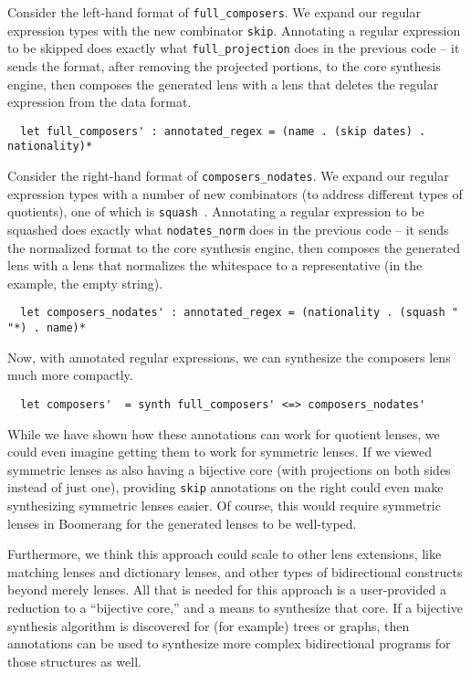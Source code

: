 \documentclass[a4paper]{article}
\begin{document}
Consider the left-hand format of \lstinline{full_composers}. We expand our
regular expression types with the new combinator \lstinline{skip}. Annotating a
regular expression to be skipped does exactly what \lstinline{full_projection}
does in the previous code -- it sends the format, after removing the projected
portions, to the core synthesis engine, then composes the generated lens with a
lens that deletes the regular expression from the data format.
%
\begin{lstlisting}
  let full_composers' : annotated_regex = (name . (skip dates) . nationality)*
\end{lstlisting}
%

Consider the right-hand format of \lstinline{composers_nodates}. We expand our
regular expression types with a number of new combinators (to address different
types of quotients), one of which is
\lstinline{squash}~\cite{maina+:quotient-synthesis}. Annotating a regular
expression to be squashed does exactly what \lstinline{nodates_norm} does in the
previous code -- it sends the normalized format to the core synthesis engine,
then composes the generated lens with a lens that normalizes the whitespace to a
representative (in the example, the empty string).
%
\begin{lstlisting}
  let composers_nodates' : annotated_regex = (nationality . (squash " "*) . name)*
\end{lstlisting}
%

Now, with annotated regular expressions, we can synthesize the composers lens much
more compactly.
%
\begin{lstlisting}
  let composers'  = synth full_composers' <=> composers_nodates'
\end{lstlisting}
%

While we have shown how these annotations can work for quotient lenses, we could
even imagine getting them to work for symmetric lenses. If we viewed symmetric
lenses as also having a bijective core (with projections on both sides instead
of just one), providing \lstinline{skip} annotations on the right could even
make synthesizing symmetric lenses easier. Of course, this would require
symmetric lenses in Boomerang for the generated lenses to be well-typed.

Furthermore, we think this approach could scale to other lens extensions, like
matching lenses and dictionary lenses, and other types of bidirectional
constructs beyond merely lenses. All that is needed for this approach is a
user-provided a reduction to a ``bijective core,'' and a means to synthesize
that core. If a bijective synthesis algorithm is discovered for
(for example) trees or graphs, then annotations can be used to synthesize more
complex bidirectional programs for those structures as well.

 

\end{document}

